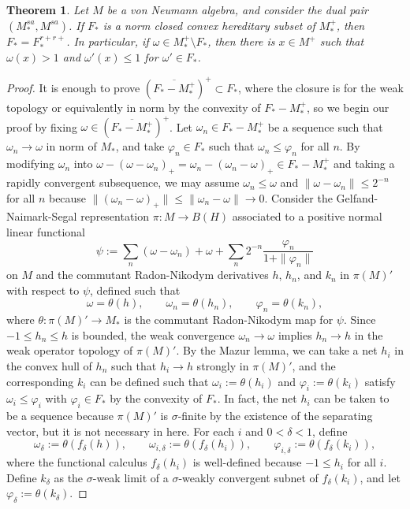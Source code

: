 \documentclass[noamsfonts,a4paper,10pt]{amsart}
\theoremstyle{plain}
\newtheorem{thm}{Theorem}[section]
\theoremstyle{definition}
\theoremstyle{remark}
\begin{document}
\begin{thm}
Let $M$ be a von Neumann algebra, and consider the dual pair $(M_*^{sa},M^{sa})$.
If $F_*$ is a norm closed convex hereditary subset of $M_*^+$, then $F_*=F_*^{r+r+}$. In particular, if $\omega\in M_*^+\setminus F_*$, then there is $x\in M^+$ such that $\omega(x)>1$ and $\omega'(x)\le1$ for $\omega'\in F_*$.
\end{thm}
\begin{proof}
It is enough to prove $(\overline{F_*-M_*^+})^+\subset F_*$, where the closure is for the weak topology or equivalently in norm by the convexity of $F_*-M_*^+$, so we begin our proof by fixing $\omega\in(\overline{F_*-M_*^+})^+$.
Let $\omega_n\in F_*-M_*^+$ be a sequence such that $\omega_n\to\omega$ in norm of $M_*$, and take $\varphi_n\in F_*$ such that $\omega_n\le\varphi_n$ for all $n$.
By modifying $\omega_n$ into $\omega-(\omega-\omega_n)_+=\omega_n-(\omega_n-\omega)_+\in F_*-M_*^+$ and taking a rapidly convergent subsequence, we may assume $\omega_n\le\omega$ and $\|\omega-\omega_n\|\le2^{-n}$ for all $n$ because $\|(\omega_n-\omega)_+\|\le\|\omega_n-\omega\|\to0$.
Consider the Gelfand-Naimark-Segal representation $\pi:M\to B(H)$ associated to a positive normal linear functional \[\psi:=\sum_n(\omega-\omega_n)+\omega+\sum_n2^{-n}\frac{\varphi_n}{1+\|\varphi_n\|}\]
on $M$ and the commutant Radon-Nikodym derivatives $h$, $h_n$, and $k_n$ in $\pi(M)'$ with respect to $\psi$, defined such that
\[\omega=\theta(h),\qquad\omega_n=\theta(h_n),\qquad\varphi_n=\theta(k_n),\]
where $\theta:\pi(M)'\to M_*$ is the commutant Radon-Nikodym map for $\psi$.
Since $-1\le h_n\le h$ is bounded, the weak convergence $\omega_n\to\omega$ implies $h_n\to h$ in the weak operator topology of $\pi(M)'$.
By the Mazur lemma, we can take a net $h_i$ in the convex hull of $h_n$ such that $h_i\to h$ strongly in $\pi(M)'$, and the corresponding $k_i$ can be defined such that $\omega_i:=\theta(h_i)$ and $\varphi_i:=\theta(k_i)$ satisfy $\omega_i\le\varphi_i$ with $\varphi_i\in F_*$ by the convexity of $F_*$.
In fact, the net $h_i$ can be taken to be a sequence because $\pi(M)'$ is $\sigma$-finite by the existence of the separating vector, but it is not necessary in here.
For each $i$ and $0<\delta<1$, define
\[\omega_\delta:=\theta(f_\delta(h)),\qquad\omega_{i,\delta}:=\theta(f_\delta(h_i)),\qquad\varphi_{i,\delta}:=\theta(f_\delta(k_i)),\]
where the functional calculus $f_\delta(h_i)$ is well-defined because $-1\le h_i$ for all $i$.
Define $k_\delta$ as the $\sigma$-weak limit of a $\sigma$-weakly convergent subnet of $f_\delta(k_i)$, and let $\varphi_\delta:=\theta(k_\delta)$.

\end{proof}
\end{document}
